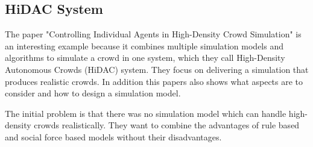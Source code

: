 \documentclass{acmsiggraph}               %
\begin{document}
\subsection{HiDAC System}

The paper "Controlling Individual Agents in High-Density Crowd Simulation" \cite{pelechano_controlling_2007} is an interesting example because it combines multiple simulation models and algorithms to simulate a crowd in one system, which they call High-Density Autonomous Crowds (HiDAC) system. They focus on delivering a simulation that produces realistic crowds.
In addition this papers also shows what aspects are to consider and how to design a simulation model.

The initial problem is that there was no simulation model which can handle high-density crowds realistically. They want to combine the advantages of rule based and social force based models without their disadvantages.
\end{document}
